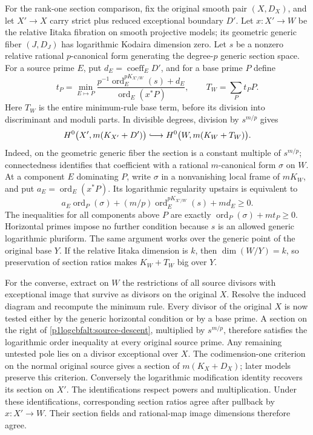 For the rank-one section comparison, fix the original smooth pair
$(X,D_X)$, and let $X'\to X$ carry strict plus reduced exceptional
boundary $D'$. Let $x:X'\to W$ be the relative Iitaka fibration
on smooth projective models; its geometric generic fiber $(J,D_J)$
has logarithmic Kodaira dimension zero. Let $s$ be a nonzero
relative rational $p$-canonical form generating the degree-$p$
generic section space. For a source prime $E$, put
$d_E=\operatorname{coeff}_E D'$, and for a base prime $P$ define
\[
 t_P=\min_{E\mapsto P}
 \frac{p^{-1}\operatorname{ord}^{pK_{X'/W}}_E(s)+d_E}
 {\operatorname{ord}_E(x^*P)},\qquad
 T_W=\sum_Pt_PP.
\]
Here $T_W$ is the entire minimum-rule base term, before its division
into discriminant and moduli parts. In divisible degrees, division by
$s^{m/p}$ gives
\begin{equation}\label{p1logcbfalt:source-descent}
 H^0\bigl(X',m(K_{X'}+D')\bigr)
 \lhook\joinrel\longrightarrow
 H^0\bigl(W,m(K_W+T_W)\bigr).
\end{equation}
Indeed, on the geometric generic fiber the section is a constant
multiple of $s^{m/p}$; connectedness identifies that coefficient
with a rational $m$-canonical form $\sigma$ on $W$. At a component
$E$ dominating $P$, write $\sigma$ in a nonvanishing local frame of
$mK_W$, and put $a_E=\operatorname{ord}_E(x^*P)$. Its logarithmic
regularity upstairs is equivalent to
\[
 a_E\operatorname{ord}_P(\sigma)
 +(m/p)\operatorname{ord}^{pK_{X'/W}}_E(s)+md_E\ge0.
\]
The inequalities for all components above $P$ are exactly
$\operatorname{ord}_P(\sigma)+mt_P\ge0$. Horizontal primes impose
no further condition because $s$ is an allowed generic logarithmic
pluriform. The same argument works over the generic point of the
original base $Y$. If the relative Iitaka dimension is $k$, then
$\dim(W/Y)=k$, so preservation of section ratios makes
$K_W+T_W$ big over $Y$.

For the converse, extract on $W$ the restrictions of all source
divisors with exceptional image that survive as divisors on the
original $X$. Resolve the induced diagram and recompute the minimum
rule. Every divisor of the original $X$ is now tested either by the
generic horizontal condition or by a base prime. A section on the
right of \eqref{p1logcbfalt:source-descent}, multiplied by $s^{m/p}$,
therefore satisfies the logarithmic order inequality at every
original source prime. Any remaining untested pole lies on a
divisor exceptional over $X$. The codimension-one criterion on the
normal original source gives a section of $m(K_X+D_X)$; later
models preserve this criterion. Conversely the logarithmic
modification identity recovers its section on $X'$. The
identifications respect powers and multiplication. Under these
identifications, corresponding section ratios agree after pullback by
$x:X'\to W$. Their section fields and rational-map image dimensions
therefore agree.

